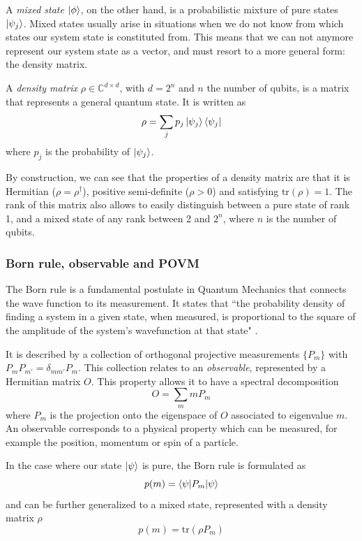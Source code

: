 \documentclass[12pt]{memoir}
\newcommand{\tr}{\text{tr}}
\begin{document}
A \textit{mixed state} $\ket \phi$, on the other hand, is a probabilistic mixture of pure states $\ket {\psi_j}$. Mixed states usually arise in situations when we do not know from which states our system state is constituted from. This means that we can not anymore represent our system state as a vector, and must resort to a more general form: the density matrix.\medbreak

A \textit{density matrix} $\rho \in \mathbb{C}^{d \times d}$, with $d = 2^n$ and $n$ the number of qubits, is a matrix that represents a general quantum state. It is written as
\begin{equation}
    \rho = \sum_{j} p_j \ket{\psi_j} \bra{\psi_j}
\end{equation}
where $p_j$ is the probability of $\ket{\psi_j}$.\medbreak

By construction, we can see that the properties of a density matrix are that it is Hermitian ($\rho = \rho^{\dagger}$), positive semi-definite ($\rho > 0$) and satisfying $\tr(\rho) = 1$. The rank of this matrix also allows to easily distinguish between a pure state of rank 1, and a mixed state of any rank between 2 and $2^n$, where $n$ is the number of qubits.

\subsubsection*{Born rule, observable and POVM}

The Born rule is a fundamental postulate in Quantum Mechanics that connects the wave function to its measurement. It states that ``the probability density of finding a system in a given state, when measured, is proportional to the square of the amplitude of the system's wavefunction at that state" \cite{wiki:born-rule}.\medbreak

It is described by a collection of orthogonal projective measurements $\{P_m\}$ with $P_mP_{m'}=\delta_{mm'}P_m$. This collection relates to an \textit{observable}, represented by a Hermitian matrix $O$. This property allows it to have a spectral decomposition
\begin{equation}
    O = \sum_m m P_m
\end{equation}
where $P_m$ is the projection onto the eigenspace of $O$ associated to eigenvalue $m$. An observable corresponds to a physical property which can be measured, for example the position, momentum or spin of a particle.\medbreak

In the case where our state $\ket \psi$ is pure, the Born rule is formulated as
\begin{equation}
    p(m) = \braket{\psi|P_m|\psi}
\end{equation}
and can be further generalized to a mixed state, represented with a density matrix $\rho$
\begin{equation}\label{eq:quantum-measurement}
    p(m) = \tr(\rho P_m)
\end{equation}
\end{document}
